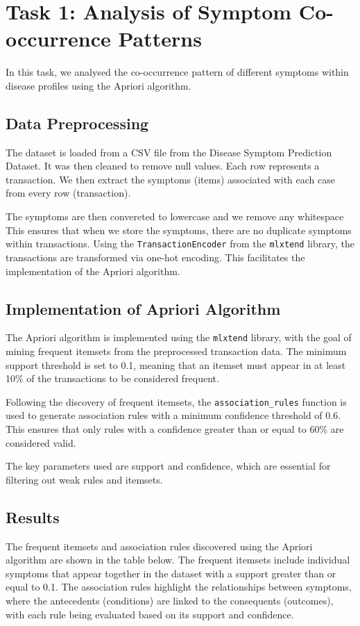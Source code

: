 \documentclass[12pt]{article}
\begin{document}
\tableofcontents

\pagebreak
{}
\section{Task 1: Analysis of Symptom Co-occurrence Patterns}

In this task, we analysed the co-occurrence pattern of different symptoms within disease profiles using the Apriori algorithm.

\subsection{Data Preprocessing}
The dataset is loaded from a CSV file from the Disease Symptom Prediction Dataset. 
It was then cleaned to remove null values. 
Each row represents a transaction. We then extract the symptoms (items) associated with each case from every row (transaction). 

The symptoms are then convereted to lowercase and we remove any whitespace
This ensures that when we store the symptoms, there are no duplicate symptoms within transactions.
Using the \texttt{TransactionEncoder} from the \texttt{mlxtend} library, the transactions are transformed via one-hot encoding. 
This facilitates the implementation of the Apriori algorithm.

\subsection{Implementation of Apriori Algorithm}
The Apriori algorithm is implemented using the \texttt{mlxtend} library, with the goal of mining frequent itemsets from the preprocessed transaction data. 
The minimum support threshold is set to 0.1, meaning that an itemset must appear in at least 10\% of the transactions to be considered frequent. 

Following the discovery of frequent itemsets, the \texttt{association\_rules} function is used to generate association rules with a minimum confidence threshold of 0.6. 
This ensures that only rules with a confidence greater than or equal to 60\% are considered valid. 

The key parameters used are support and confidence, which are essential for filtering out weak rules and itemsets.

\subsection{Results}
The frequent itemsets and association rules discovered using the Apriori algorithm are shown in the table below. 
The frequent itemsets include individual symptoms that appear together in the dataset with a support greater than or equal to 0.1. 
The association rules highlight the relationships between symptoms, where the antecedents (conditions) are linked to the consequents (outcomes), with each rule being evaluated based on its support and confidence.
\end{document}
